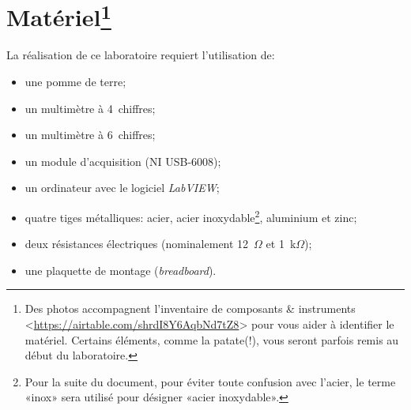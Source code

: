 \documentclass[canadien,12pt,oneside,letterpaper]{article}
\begin{document}


\section[Matériel]{Matériel\footnote{Des photos accompagnent l'inventaire de composants \& instruments <\url{https://airtable.com/shrdI8Y6AqbNd7tZ8}> pour vous aider à identifier le matériel. Certains éléments, comme la patate(!), vous seront parfois remis au début du laboratoire.}} \label{sec:mat}

\noindent La réalisation de ce laboratoire requiert l'utilisation de:
\vspace{1ex}
\begin{itemize} \itemsep5pt
\item une pomme de terre;
\item un multimètre à 4\textonehalf~chiffres;
\item un multimètre à 6\textonehalf~chiffres;
\item un module d'acquisition (NI USB-6008);
\item un ordinateur avec le logiciel \textit{LabVIEW};
\item quatre tiges métalliques: acier, acier inoxydable\footnote{Pour la suite du document, pour éviter toute confusion avec l'acier, le terme «inox» sera utilisé pour désigner «acier inoxydable».}, aluminium et zinc;
\item deux résistances électriques (nominalement 12~$\Omega$ et 1~k$\Omega$);
\item une plaquette de montage (\textit{breadboard}).
\end{itemize}
\end{document}
